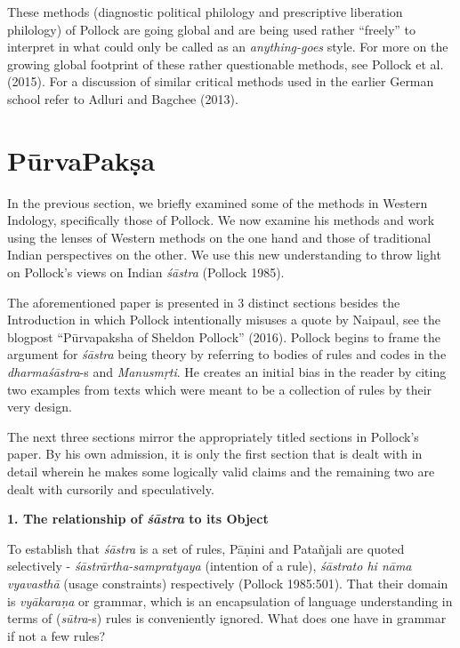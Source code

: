 These methods (diagnostic political philology and prescriptive liberation philology) of Pollock are going global and are being used rather ``freely'' to interpret in what could only be called as an {\sl anything-goes} style. For more on the growing global footprint of these rather questionable methods, see Pollock et al. (2015). For a discussion of similar critical methods used in the earlier German school refer to Adluri and Bagchee (2013).

\section*{PūrvaPakṣa}

In the previous section, we briefly examined some of the methods in Western Indology, specifically those of Pollock.  We now examine his methods and work using the lenses of Western methods on the one hand and those of traditional Indian perspectives on the other. We use this new understanding to throw light on Pollock's views on Indian {\sl śāstra} (Pollock 1985).

The aforementioned paper is presented in 3 distinct sections besides the Introduction in which Pollock intentionally misuses a quote by Naipaul, see the blogpost ``Pūrvapaksha of Sheldon Pollock'' (2016). Pollock begins to frame the argument for {\sl śāstra} being theory by referring to bodies of rules and codes in the {\sl dharmaśāstra}-s and {\sl Manusmṛti}. He creates an initial bias in the reader by citing two examples from texts which were meant to be a collection of rules by their very design.

The next three sections mirror the appropriately titled sections in Pollock's paper. By his own admission, it is only the first section that is dealt with in detail wherein he makes some logically valid claims and the remaining two are dealt with cursorily and speculatively.

{\bf 1. The relationship of {{\sl\bfseries śāstra}\relax} to its Object}

To establish that {\sl śāstra} is a set of rules, Pāṇini and Patañjali are quoted selectively - {\sl śāstrārtha-sampratyaya} (intention of a rule), {\sl śāstrato hi nāma vyavasthā} (usage constraints) respectively (Pollock 1985:501). That their domain is {\sl vyākaraṇa} or grammar, which is an encapsulation of language understanding in terms of ({\sl sūtra}-s) rules is conveniently ignored. What does one have in grammar if not a few rules? 

